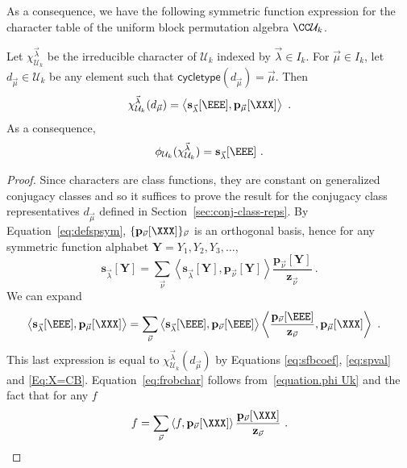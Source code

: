 As a consequence, we have the following symmetric function expression for
the character table of the uniform block permutation algebra $\CC\mathcal{U}_k$.
\begin{theorem}
\label{conj:frobchar}
Let $\chi^{\vec{\lambda}}_{\mathcal{U}_k}$ be the irreducible character of $\mathcal{U}_k$ indexed by $\vec{\lambda}\in I_k$.
For $\vec{\mu} \in I_k$, let $d_{\vec{\mu}} \in \mathcal{U}_k$ be any element
such that $\mathsf{cycletype}(d_{\vec{\mu}}) = \vec{\mu}$. Then
\begin{equation}\label{eq:sfexpr}
\chi^{\vec{\lambda}}_{\mathcal{U}_k}(d_{\vec{\mu}}) = \left< \mathbf{s}_{\vec{\lambda}}[\EEE], \mathbf{p}_{\vec{\mu}}[\XXX] \right>~.
\end{equation}
As a consequence,
\begin{equation}
\label{eq:frobchar}
    \phi_{\mathcal{U}_k}( \chi^{\vec{\lambda}}_{\mathcal{U}_k} )
    = \mathbf{s}_{\vec{\lambda}}[\EEE]~.
\end{equation}
\end{theorem}

\begin{proof}
Since characters are class functions, they are constant on generalized
conjugacy classes and so it suffices to prove the result for the conjugacy
class representatives $d_{\vec{\mu}}$ defined in Section~\ref{sec:conj-class-reps}.
By Equation~\eqref{eq:defspsym}, $\{ \mathbf{p}_{\vec{\nu}}[\XXX] \}_{\vec{\nu}}$
is an orthogonal basis, hence for any symmetric function alphabet $\mathbf{Y} = Y_1, Y_2, Y_3, \ldots$,
$$\mathbf{s}_{\vec{\lambda}}[\mathbf{Y}] = \sum_{\vec{\nu}}
\left< \mathbf{s}_{\vec{\lambda}}[\mathbf{Y}], \mathbf{p}_{\vec{\nu}}[\mathbf{Y}]\right>
\frac{\mathbf{p}_{\vec{\nu}}[\mathbf{Y}]}{\mathbf{z}_{\vec{\nu}}}~.
$$
We can expand
\begin{align}\label{eq:sfversionXeqCB}
\left< \mathbf{s}_{\vec{\lambda}}[\EEE], \mathbf{p}_{\vec{\mu}}[\XXX] \right>&=
\sum_{\vec{\nu}} \left< \mathbf{s}_{\vec{\lambda}}[\EEE],
\mathbf{p}_{\vec{\nu}}[\EEE] \right>
\left< \frac{\mathbf{p}_{\vec{\nu}}[\EEE]}{\mathbf{z}_{\vec{\nu}}},\mathbf{p}_{\vec{\mu}}[\XXX] \right>~.
\end{align}
This last expression is equal to $\chi^{\vec{\lambda}}_{\mathcal{U}_k}(d_{\vec{\mu}})$
by Equations \eqref{eq:sfbcoef}, \eqref{eq:spval} and \eqref{Eq:X=CB}.
Equation~\eqref{eq:frobchar} follows from~\eqref{equation.phi Uk} and the fact that for any $f$
$$f = \sum_{\vec{\nu}} \left< f, \mathbf{p}_{\vec{\nu}}[\XXX]\right>
\frac{\mathbf{p}_{\vec{\nu}}[\XXX]}{\mathbf{z}_{\vec{\nu}}}~.
$$
\end{proof}

